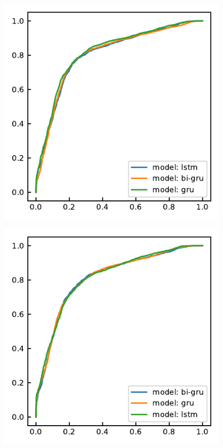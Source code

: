 \begin{figure}[H]
	\centering
	
	\begin{minipage}[b]{0.45\columnwidth}
		\centering
		\includegraphics[clip, width=\linewidth]{fig/chapter4/3d/roc/depth_10.pdf}
		\label{fig:}
	\end{minipage}
	\begin{minipage}[b]{0.45\columnwidth}
		\centering
		\includegraphics[clip, width=\linewidth]{fig/chapter4/3d/roc/depth_50.pdf}

\end{minipage}
\end{figure}

